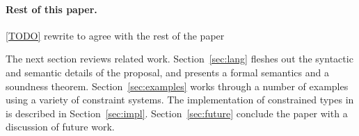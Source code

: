 \paragraph{Rest of this paper.}

\ref{TODO} rewrite to agree with the rest of the paper

The next section reviews related work.
Section~\ref{sec:lang} fleshes out the syntactic and semantic details of the
proposal, and presents a formal semantics
and a soundness theorem.
Section~\ref{sec:examples} works through a number of
examples using a variety of constraint systems.
The implementation of constrained types in \Xten{} is described
in Section~\ref{sec:impl}.
Section~\ref{sec:future}
conclude the paper with a discussion of
future work.

